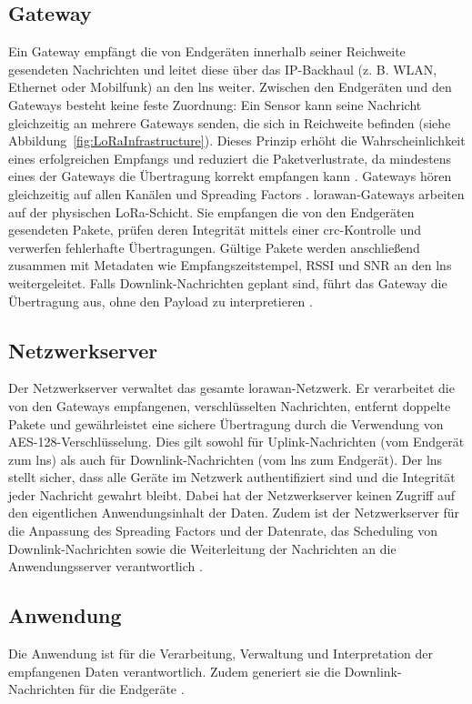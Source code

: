 \subsection{Gateway}
	Ein Gateway empfängt die von Endgeräten innerhalb seiner Reichweite gesendeten Nachrichten und leitet diese über das IP-Backhaul (z. B. WLAN, Ethernet oder Mobilfunk) an den \ac{lns} weiter. Zwischen den Endgeräten und den Gateways besteht keine feste Zuordnung: Ein Sensor kann seine Nachricht gleichzeitig an mehrere Gateways senden, die sich in Reichweite befinden (siehe Abbildung~\ref{fig:LoRaInfrastructure}). Dieses Prinzip erhöht die Wahrscheinlichkeit eines erfolgreichen Empfangs und reduziert die Paketverlustrate, da mindestens eines der Gateways die Übertragung korrekt empfangen kann \cite{Semtech:2024}.  
	Gateways hören gleichzeitig auf allen Kanälen und Spreading Factors \cite{Montagny:2022}.
	\ac{lorawan}-Gateways arbeiten auf der physischen LoRa-Schicht. Sie empfangen die von den Endgeräten gesendeten Pakete, prüfen deren Integrität mittels einer \ac{crc}-Kontrolle und verwerfen fehlerhafte Übertragungen. Gültige Pakete werden anschlie{\ss}end zusammen mit Metadaten wie Empfangszeitstempel, RSSI und SNR an den \ac{lns} weitergeleitet. Falls Downlink-Nachrichten geplant sind, führt das Gateway die Übertragung aus, ohne den Payload zu interpretieren \cite{Semtech:2024}.
	
\subsection{Netzwerkserver}
	Der Netzwerkserver verwaltet das gesamte \ac{lorawan}-Netzwerk. Er verarbeitet die von den Gateways empfangenen, verschlüsselten Nachrichten, entfernt doppelte Pakete und gewährleistet eine sichere Übertragung durch die Verwendung von AES-128-Verschlüsselung. Dies gilt sowohl für Uplink-Nachrichten (vom Endgerät zum \ac{lns}) als auch für Downlink-Nachrichten (vom \ac{lns} zum Endgerät). Der \ac{lns} stellt sicher, dass alle Geräte im Netzwerk authentifiziert sind und die Integrität jeder Nachricht gewahrt bleibt. Dabei hat der Netzwerkserver keinen Zugriff auf den eigentlichen Anwendungsinhalt der Daten. Zudem ist der Netzwerkserver für die Anpassung des Spreading Factors und der Datenrate, das Scheduling von Downlink-Nachrichten sowie die Weiterleitung der Nachrichten an die Anwendungsserver verantwortlich \cite{Semtech:2024, Montagny:2022}.

\subsection{Anwendung}
	Die Anwendung ist für die Verarbeitung, Verwaltung und Interpretation der empfangenen Daten verantwortlich. Zudem generiert sie die Downlink-Nachrichten für die Endgeräte \cite{Semtech:2024}.

